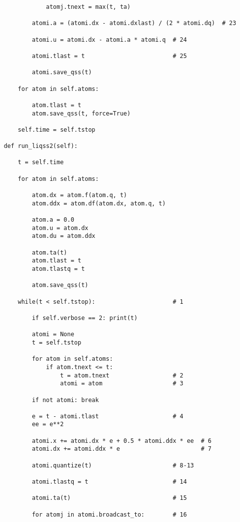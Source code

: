 \begin{lstlisting}
                atomj.tnext = max(t, ta)

            atomi.a = (atomi.dx - atomi.dxlast) / (2 * atomi.dq)  # 23

            atomi.u = atomi.dx - atomi.a * atomi.q  # 24

            atomi.tlast = t                         # 25

            atomi.save_qss(t)

        for atom in self.atoms:

            atom.tlast = t
            atom.save_qss(t, force=True)

        self.time = self.tstop

    def run_liqss2(self):

        t = self.time

        for atom in self.atoms:

            atom.dx = atom.f(atom.q, t)
            atom.ddx = atom.df(atom.dx, atom.q, t)

            atom.a = 0.0
            atom.u = atom.dx
            atom.du = atom.ddx

            atom.ta(t)
            atom.tlast = t
            atom.tlastq = t

            atom.save_qss(t)

        while(t < self.tstop):                      # 1

            if self.verbose == 2: print(t)

            atomi = None
            t = self.tstop

            for atom in self.atoms:
                if atom.tnext <= t:
                    t = atom.tnext                  # 2
                    atomi = atom                    # 3

            if not atomi: break

            e = t - atomi.tlast                     # 4
            ee = e**2

            atomi.x += atomi.dx * e + 0.5 * atomi.ddx * ee  # 6
            atomi.dx += atomi.ddx * e                       # 7

            atomi.quantize(t)                       # 8-13

            atomi.tlastq = t                        # 14

            atomi.ta(t)                             # 15

            for atomj in atomi.broadcast_to:        # 16


\end{lstlisting}
